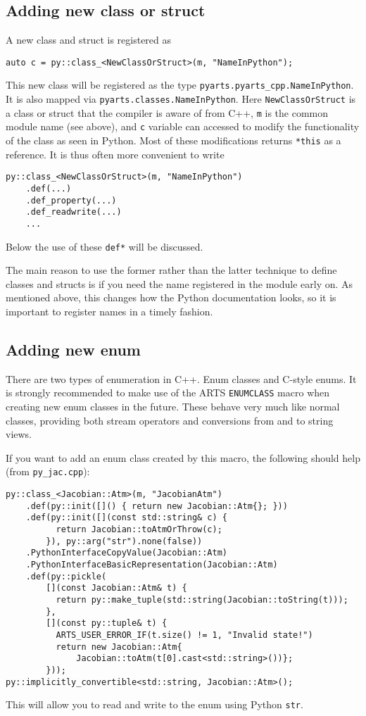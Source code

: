 \subsection{Adding new class or struct \label{subsec: new class}}
A new class and struct is registered as
\begin{verbatim}
auto c = py::class_<NewClassOrStruct>(m, "NameInPython");
\end{verbatim}

This new class will be registered as the type \verb|pyarts.pyarts_cpp.NameInPython|.  It is also mapped via \verb|pyarts.classes.NameInPython|.
Here \verb|NewClassOrStruct| is a class or struct that the compiler is aware of from C++, \verb|m| is the common module name (see above), and
\verb|c| variable can accessed to modify the functionality of the class as seen in Python.  Most of these modifications returns \verb|*this| as 
a reference.  It is thus often more convenient to write
\begin{verbatim}
py::class_<NewClassOrStruct>(m, "NameInPython")
    .def(...)
    .def_property(...)
    .def_readwrite(...)
    ...
\end{verbatim}
Below the use of these \verb|def*| will be discussed.

The main reason to use the former rather than the latter technique to define classes and structs is if you need the name
registered in the module early on.  As mentioned above, this changes how the Python documentation looks, so it is important
to register names in a timely fashion.

\subsection{Adding new enum}
There are two types of enumeration in C++.  Enum classes and C-style enums.  It is strongly recommended to make use of the
ARTS \verb|ENUMCLASS| macro when creating new enum classes in the future.  These behave very much like normal classes,
providing both stream operators and conversions from and to string views.

If you want to add an enum class created by this macro, the following
should help (from \verb|py_jac.cpp|):
\begin{verbatim}
py::class_<Jacobian::Atm>(m, "JacobianAtm")
    .def(py::init([]() { return new Jacobian::Atm{}; }))
    .def(py::init([](const std::string& c) { 
          return Jacobian::toAtmOrThrow(c); 
        }), py::arg("str").none(false))
    .PythonInterfaceCopyValue(Jacobian::Atm)
    .PythonInterfaceBasicRepresentation(Jacobian::Atm)
    .def(py::pickle(
        [](const Jacobian::Atm& t) {
          return py::make_tuple(std::string(Jacobian::toString(t)));
        },
        [](const py::tuple& t) {
          ARTS_USER_ERROR_IF(t.size() != 1, "Invalid state!")
          return new Jacobian::Atm{
              Jacobian::toAtm(t[0].cast<std::string>())};
        }));
py::implicitly_convertible<std::string, Jacobian::Atm>();
\end{verbatim}
This will allow you to read and write to the enum using Python \verb|str|.

